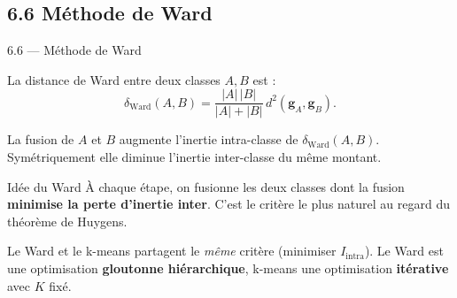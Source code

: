 \subsection{6.6 Méthode de Ward}
\begin{frame}{6.6 — Méthode de Ward}
\begin{definition}
La distance de Ward entre deux classes $A, B$ est :
\[
\delta_{\text{Ward}}(A, B)
= \frac{|A|\,|B|}{|A|+|B|}\, d^2(\mathbf{g}_A, \mathbf{g}_B).
\]
\end{definition}

\begin{theorem}
La fusion de $A$ et $B$ \alert{augmente} l'inertie intra-classe de
$\delta_{\text{Ward}}(A, B)$. Symétriquement elle \alert{diminue}
l'inertie inter-classe du même montant.
\end{theorem}

\begin{block}{Idée du Ward}
\small À chaque étape, on fusionne les deux classes dont la fusion
\textbf{minimise la perte d'inertie inter}. C'est le critère le plus naturel
au regard du théorème de Huygens.
\end{block}

\begin{rema}
\small Le Ward et le k-means partagent le \emph{même} critère
(minimiser $I_{\text{intra}}$). Le Ward est une optimisation
\textbf{gloutonne hiérarchique}, k-means une optimisation
\textbf{itérative} avec $K$ fixé.
\end{rema}
\end{frame}

